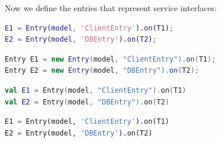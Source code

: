 Now we define the entries that represent service interfaces:
\begin{MATLAB}
\begin{lstlisting}[language = matlab]
E1 = Entry(model, 'ClientEntry').on(T1);
E2 = Entry(model, 'DBEntry').on(T2);
\end{lstlisting}
\end{MATLAB}
\begin{JAVA}
\begin{lstlisting}[language = java, basicstyle=\ttfamily\scriptsize]
Entry E1 = new Entry(model, "ClientEntry").on(T1);
Entry E2 = new Entry(model, "DBEntry").on(T2);
\end{lstlisting}
\end{JAVA}
\begin{KOTLIN}
\begin{lstlisting}[language = kotlin, basicstyle=\ttfamily\scriptsize]
val E1 = Entry(model, "ClientEntry").on(T1)
val E2 = Entry(model, "DBEntry").on(T2)
\end{lstlisting}
\end{KOTLIN}
\begin{PYTHON}
\begin{lstlisting}[language = python]
E1 = Entry(model, 'ClientEntry').on(T1)
E2 = Entry(model, 'DBEntry').on(T2)
\end{lstlisting}
\end{PYTHON}

